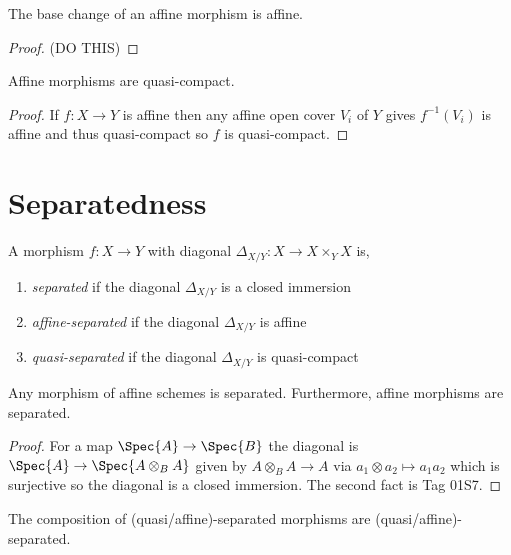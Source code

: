 \documentclass[12pt]{article}
\begin{document}
\begin{lemma}
The base change of an affine morphism is affine. 
\end{lemma}

\begin{proof}
(DO THIS)
\end{proof}


\begin{lemma}
Affine morphisms are quasi-compact.
\end{lemma}

\begin{proof}
If $f : X \to Y$ is affine then any affine open cover $V_i$ of $Y$ gives $f^{-1}(V_i)$ is affine and thus quasi-compact so $f$ is quasi-compact. 
\end{proof}



\section{Separatedness}

\begin{defn}
A morphism $f : X \to Y$ with diagonal $\Delta_{X/Y} : X \to X \times_Y X$ is,
\begin{enumerate}
\item \textit{separated} if the diagonal $\Delta_{X/Y}$ is a closed immersion
\item \textit{affine-separated} if the diagonal $\Delta_{X/Y}$ is affine
\item \textit{quasi-separated} if the diagonal $\Delta_{X/Y}$ is quasi-compact
\end{enumerate}
\end{defn}

\begin{lemma}
Any morphism of affine schemes is separated. Furthermore, affine morphisms are separated.
\end{lemma}

\begin{proof}
For a map $\Spec{A} \to \Spec{B}$ the diagonal is $\Spec{A} \to \Spec{A \otimes_B A}$ given by $A \otimes_B A \to A$ via $a_1 \otimes a_2 \mapsto a_1 a_2$ which is surjective so the diagonal is a closed immersion. The second fact is Tag 01S7.
\end{proof}

\begin{lemma}
The composition of (quasi/affine)-separated morphisms are (quasi/affine)-separated. 
\end{lemma}
\end{document}
